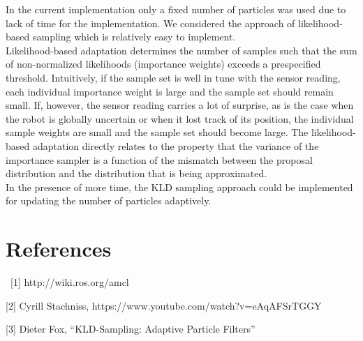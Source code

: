 \documentclass{article}
\begin{document}
In the current implementation only a fixed number of particles was used due to lack of time for the implementation. We considered the approach of likelihood-based sampling which is relatively easy to implement. \\
Likelihood-based adaptation determines the number of samples such that the sum of non-normalized likelihoods (importance weights) exceeds a prespecified threshold. Intuitively, if the sample set is well in tune with the sensor reading, each individual importance weight is large and the sample set should remain small. If, however, the sensor reading carries a lot of surprise, as is the case when the robot is globally uncertain or when it lost track of its position, the individual sample weights are small and the sample set should become large. The likelihood-based adaptation directly relates to the property that the variance of the importance sampler is a function of the mismatch between the proposal distribution and the distribution that is being approximated. \\
In the presence of more time, the KLD sampling approach could be implemented for updating the number of particles adaptively.


\section{References}\
[1] http://wiki.ros.org/amcl 

[2] Cyrill Stachniss,  https://www.youtube.com/watch?v=eAqAFSrTGGY

[3] Dieter Fox, ``KLD-Sampling: Adaptive Particle Filters''
\end{document}
